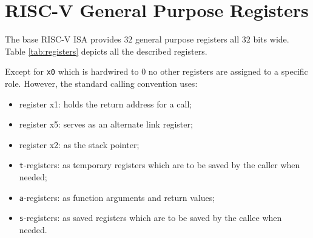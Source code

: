 \section{RISC-V General Purpose Registers}
\label{sec:riscv_reg}

The base RISC-V ISA provides $32$ general purpose registers all $32$ bits wide.
Table \ref{tab:registers} depicts all the described registers.

Except for \texttt{x0} which is hardwired to $0$ no other registers are assigned
to a specific role. However, the standard calling convention uses:
\begin{itemize}
  \item register x1: holds the return address for a call;

  \item register x5: serves as an alternate link register;

  \item register x2: as the stack pointer;

  \item \texttt{t}-registers: as temporary registers which are to be saved by the
    caller when needed;

  \item \texttt{a}-registers: as function arguments and return values;

  \item \texttt{s}-registers: as saved registers which are to be saved by the callee
    when needed.
\end{itemize}

